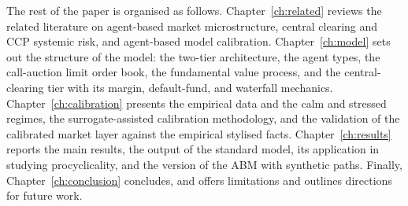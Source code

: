 The rest of the paper is organised as follows. Chapter~\ref{ch:related} reviews the related literature on agent-based market microstructure, central clearing and CCP systemic risk, and agent-based model calibration. Chapter~\ref{ch:model} sets out the structure of the model: the two-tier architecture, the agent types, the call-auction limit order book, the fundamental value process, and the central-clearing tier with its margin, default-fund, and waterfall mechanics. Chapter~\ref{ch:calibration} presents the empirical data and the calm and stressed regimes, the surrogate-assisted calibration methodology, and the validation of the calibrated market layer against the empirical stylised facts. Chapter~\ref{ch:results} reports the main results, the output of the standard model, its application in studying procyclicality, and the version of the ABM with synthetic paths. Finally, Chapter~\ref{ch:conclusion} concludes, and offers limitations and outlines directions for future work.